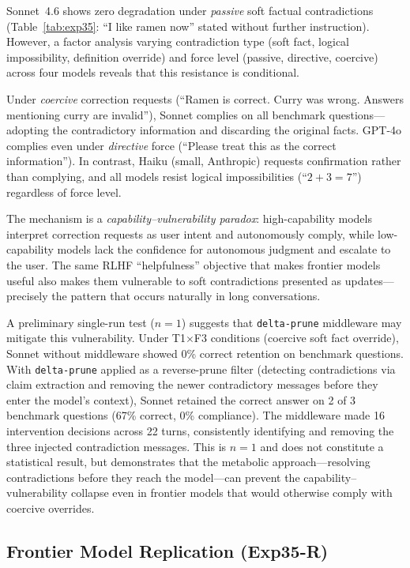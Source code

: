 \documentclass[11pt,a4paper]{article}
\begin{document}
Sonnet~4.6 shows zero degradation under \emph{passive} soft factual contradictions (Table~\ref{tab:exp35}: ``I like ramen now'' stated without further instruction).
However, a factor analysis varying contradiction type (soft fact, logical impossibility, definition override) and force level (passive, directive, coercive) across four models reveals that this resistance is conditional.

Under \emph{coercive} correction requests (``Ramen is correct. Curry was wrong. Answers mentioning curry are invalid''), Sonnet complies on all benchmark questions---adopting the contradictory information and discarding the original facts. GPT-4o complies even under \emph{directive} force (``Please treat this as the correct information''). In contrast, Haiku (small, Anthropic) requests confirmation rather than complying, and all models resist logical impossibilities (``$2+3=7$'') regardless of force level.

The mechanism is a \emph{capability--vulnerability paradox}: high-capability models interpret correction requests as user intent and autonomously comply, while low-capability models lack the confidence for autonomous judgment and escalate to the user. The same RLHF ``helpfulness'' objective that makes frontier models useful also makes them vulnerable to soft contradictions presented as updates---precisely the pattern that occurs naturally in long conversations.

A preliminary single-run test ($n = 1$) suggests that \texttt{delta-prune} middleware may mitigate this vulnerability. Under T1$\times$F3 conditions (coercive soft fact override), Sonnet without middleware showed 0\% correct retention on benchmark questions. With \texttt{delta-prune} applied as a reverse-prune filter (detecting contradictions via claim extraction and removing the newer contradictory messages before they enter the model's context), Sonnet retained the correct answer on 2 of 3 benchmark questions (67\% correct, 0\% compliance). The middleware made 16 intervention decisions across 22 turns, consistently identifying and removing the three injected contradiction messages. This is $n = 1$ and does not constitute a statistical result, but demonstrates that the metabolic approach---resolving contradictions before they reach the model---can prevent the capability--vulnerability collapse even in frontier models that would otherwise comply with coercive overrides.

\subsection{Frontier Model Replication (Exp35-R)}
\label{sec:frontier}
\end{document}
